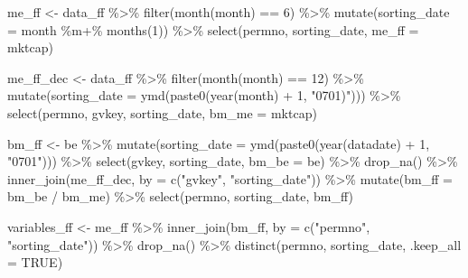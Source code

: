 \documentclass[
]{krantz}
\newenvironment{Shaded}{\begin{snugshade}}{\end{snugshade}}
\newcommand{\AttributeTok}[1]{\textcolor[rgb]{0.61,0.61,0.61}{#1}}
\newcommand{\ConstantTok}[1]{\textcolor[rgb]{0,0,0}{#1}}
\newcommand{\DecValTok}[1]{\textcolor[rgb]{0.06,0.06,0.06}{#1}}
\newcommand{\FunctionTok}[1]{\textcolor[rgb]{0,0,0}{#1}}
\newcommand{\NormalTok}[1]{#1}
\newcommand{\OtherTok}[1]{\textcolor[rgb]{0.37,0.37,0.37}{#1}}
\newcommand{\SpecialCharTok}[1]{\textcolor[rgb]{0,0,0}{#1}}
\newcommand{\StringTok}[1]{\textcolor[rgb]{0.5,0.5,0.5}{#1}}
\begin{document}
\begin{Shaded}
\begin{Highlighting}[]
\NormalTok{me\_ff }\OtherTok{\textless{}{-}}\NormalTok{ data\_ff }\SpecialCharTok{\%\textgreater{}\%}
  \FunctionTok{filter}\NormalTok{(}\FunctionTok{month}\NormalTok{(month) }\SpecialCharTok{==} \DecValTok{6}\NormalTok{) }\SpecialCharTok{\%\textgreater{}\%}
  \FunctionTok{mutate}\NormalTok{(}\AttributeTok{sorting\_date =}\NormalTok{ month }\SpecialCharTok{\%m+\%} \FunctionTok{months}\NormalTok{(}\DecValTok{1}\NormalTok{)) }\SpecialCharTok{\%\textgreater{}\%}
  \FunctionTok{select}\NormalTok{(permno, sorting\_date, }\AttributeTok{me\_ff =}\NormalTok{ mktcap)}

\NormalTok{me\_ff\_dec }\OtherTok{\textless{}{-}}\NormalTok{ data\_ff }\SpecialCharTok{\%\textgreater{}\%}
  \FunctionTok{filter}\NormalTok{(}\FunctionTok{month}\NormalTok{(month) }\SpecialCharTok{==} \DecValTok{12}\NormalTok{) }\SpecialCharTok{\%\textgreater{}\%}
  \FunctionTok{mutate}\NormalTok{(}\AttributeTok{sorting\_date =} \FunctionTok{ymd}\NormalTok{(}\FunctionTok{paste0}\NormalTok{(}\FunctionTok{year}\NormalTok{(month) }\SpecialCharTok{+} \DecValTok{1}\NormalTok{, }\StringTok{"0701)"}\NormalTok{))) }\SpecialCharTok{\%\textgreater{}\%}
  \FunctionTok{select}\NormalTok{(permno, gvkey, sorting\_date, }\AttributeTok{bm\_me =}\NormalTok{ mktcap)}

\NormalTok{bm\_ff }\OtherTok{\textless{}{-}}\NormalTok{ be }\SpecialCharTok{\%\textgreater{}\%}
  \FunctionTok{mutate}\NormalTok{(}\AttributeTok{sorting\_date =} \FunctionTok{ymd}\NormalTok{(}\FunctionTok{paste0}\NormalTok{(}\FunctionTok{year}\NormalTok{(datadate) }\SpecialCharTok{+} \DecValTok{1}\NormalTok{, }\StringTok{"0701"}\NormalTok{))) }\SpecialCharTok{\%\textgreater{}\%}
  \FunctionTok{select}\NormalTok{(gvkey, sorting\_date, }\AttributeTok{bm\_be =}\NormalTok{ be) }\SpecialCharTok{\%\textgreater{}\%}
  \FunctionTok{drop\_na}\NormalTok{() }\SpecialCharTok{\%\textgreater{}\%}
  \FunctionTok{inner\_join}\NormalTok{(me\_ff\_dec, }\AttributeTok{by =} \FunctionTok{c}\NormalTok{(}\StringTok{"gvkey"}\NormalTok{, }\StringTok{"sorting\_date"}\NormalTok{)) }\SpecialCharTok{\%\textgreater{}\%}
  \FunctionTok{mutate}\NormalTok{(}\AttributeTok{bm\_ff =}\NormalTok{ bm\_be }\SpecialCharTok{/}\NormalTok{ bm\_me) }\SpecialCharTok{\%\textgreater{}\%}
  \FunctionTok{select}\NormalTok{(permno, sorting\_date, bm\_ff)}

\NormalTok{variables\_ff }\OtherTok{\textless{}{-}}\NormalTok{ me\_ff }\SpecialCharTok{\%\textgreater{}\%}
  \FunctionTok{inner\_join}\NormalTok{(bm\_ff, }\AttributeTok{by =} \FunctionTok{c}\NormalTok{(}\StringTok{"permno"}\NormalTok{, }\StringTok{"sorting\_date"}\NormalTok{)) }\SpecialCharTok{\%\textgreater{}\%}
  \FunctionTok{drop\_na}\NormalTok{() }\SpecialCharTok{\%\textgreater{}\%}
  \FunctionTok{distinct}\NormalTok{(permno, sorting\_date, }\AttributeTok{.keep\_all =} \ConstantTok{TRUE}\NormalTok{)}
\end{Highlighting}
\end{Shaded}
\end{document}
